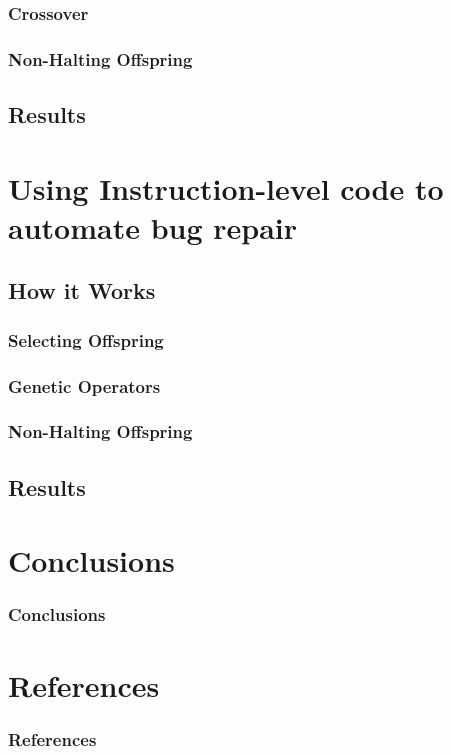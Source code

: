 \documentclass{beamer}
\begin{document}
\begin{frame}
  \frametitle{Crossover}
\end{frame}

\begin{frame}
\frametitle{Non-Halting Offspring}
\end{frame}

\subsection[Results]{Results}


\section[Evolving Assembly]{Using Instruction-level code to automate bug repair}

\subsection{How it Works}
\begin{frame}
  \frametitle{Selecting Offspring}
\end{frame}

\begin{frame}
  \frametitle{Genetic Operators}
\end{frame}

\begin{frame}
  \frametitle{Non-Halting Offspring}
\end{frame}

\subsection[Results]{Results}

\section[Conclusions]{Conclusions}

\begin{frame}
\frametitle{Conclusions}
\end{frame}

\section*{References}

\begin{frame} 
	\frametitle{References} 
	
	\begin{thebibliography}{lskdjf}
  	\end{thebibliography}
\end{frame} 
\end{document}
